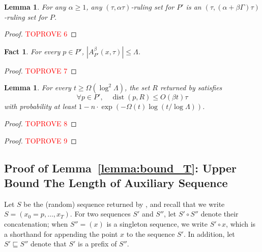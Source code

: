 \documentclass[11pt,letterpaper]{article}
\theoremstyle{plain}
\newtheorem{lemma}[theorem]{Lemma}
\newtheorem{fact}[theorem]{Fact}
\theoremstyle{definition}
\theoremstyle{remark}
\DeclareMathOperator{\dist}{dist}
\begin{document}
    \begin{lemma}
        \label{lemma:rs_Pprime_to_P}
        For any $\alpha \geq 1$,
        any $(\tau, \alpha \tau)$-ruling set for $P'$
        is an $(\tau, (\alpha + \beta\Gamma) \tau)$-ruling set for $P$.
    \end{lemma}
    \begin{proof}\textcolor{red}{TOPROVE 6}\end{proof}

    \begin{fact}
        \label{fact:Lambda_ub}
        For every $p \in P'$, $|A_{P'}^\beta(x, \tau)| \leq \Lambda$.
    \end{fact}
    \begin{proof}\textcolor{red}{TOPROVE 7}\end{proof}
    
    \begin{lemma}
        \label{lemma:approximation_ratio}
For every $t \geq \Omega(\log^2 \Lambda)$,
        the set $R$ returned by  satisfies
        \begin{equation*}
            \forall p\in P',\quad \dist(p, R) \leq O(\beta t) \tau
        \end{equation*}
        with probability at least $1 - n \cdot \exp(-\Omega(t) \log(t / \log \Lambda))$.
    \end{lemma}
\begin{proof}\textcolor{red}{TOPROVE 8}\end{proof}



\begin{proof}\textcolor{red}{TOPROVE 9}\end{proof}

\subsection{Proof of Lemma~\ref{lemma:bound_T}: Upper Bound The Length of Auxiliary Sequence}
 \label{sec:proof_bound_T}

        Let $S$ be the (random) sequence returned by ,
        and recall that we write $S =(x_0 = p, \ldots, x_T)$.
        For two sequences $S'$ and $S''$, let $S'\circ S''$ denote their concatenation; when $S'' = (x) $ is a singleton sequence, we write $S'\circ x$, which is a shorthand for appending the point $x$ to the sequence $S'$.     
        In addition, let $S'\sqsubseteq S''$ denote that $S'$ is a prefix of $S''$. 
        
\end{document}
